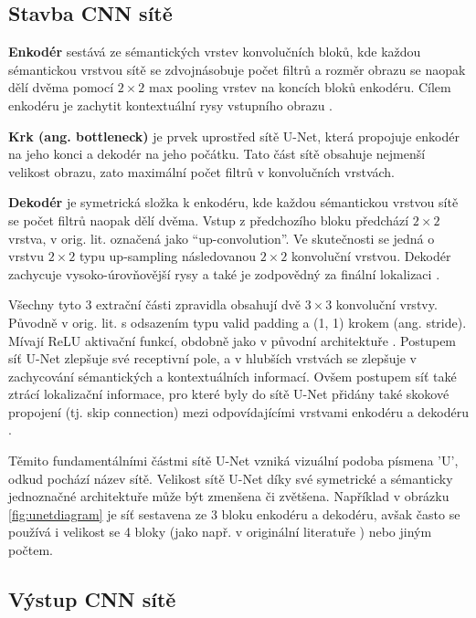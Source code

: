 \subsection{Stavba CNN sítě}
\label{subsec:Chapter221}

\textbf{Enkodér} sestává ze sémantických vrstev konvolučních bloků, kde každou sémantickou vrstvou sítě se zdvojnásobuje počet filtrů a rozměr obrazu se naopak dělí dvěma pomocí $2\times2$ max pooling vrstev na koncích bloků enkodéru. Cílem enkodéru je zachytit kontextuální rysy vstupního obrazu \cite{unet_success}.

\textbf{Krk (ang. bottleneck)} je prvek uprostřed sítě U-Net, která propojuje enkodér na jeho konci a dekodér na jeho počátku. Tato část sítě obsahuje nejmenší velikost obrazu, zato maximální počet filtrů v konvolučních vrstvách.

\textbf{Dekodér} je symetrická složka k enkodéru, kde každou sémantickou vrstvou sítě se počet filtrů naopak dělí dvěma. Vstup z předchozího bloku předchází $2\times2$ vrstva, v orig. lit. označená jako \enquote{up-convolution}. Ve skutečnosti se jedná o vrstvu $2\times2$ typu up-sampling následovanou $2\times2$ konvoluční vrstvou. Dekodér zachycuje vysoko-úrovňovější rysy a také je zodpovědný za finální lokalizaci \cite{unet_success}.

Všechny tyto 3 extrační části zpravidla obsahují dvě $3\times3$ konvoluční vrstvy. Původně v orig. lit. s odsazením typu valid padding a (1, 1) krokem (ang. stride). Mívají ReLU aktivační funkcí, obdobně jako v původní architektuře \cite{unet}. Postupem síť U-Net zlepšuje své receptivní pole, a v hlubších vrstvách se zlepšuje v zachycování sémantických a kontextuálních informací. Ovšem postupem síť také ztrácí lokalizační informace, pro které byly do sítě U-Net přidány také skokové propojení (tj. skip connection) mezi odpovídajícími vrstvami enkodéru a dekodéru \cite{unet_success}.

Těmito fundamentálními částmi sítě U-Net vzniká vizuální podoba písmena 'U', odkud pochází název sítě. Velikost sítě U-Net díky své symetrické a sémanticky jednoznačné architektuře může být zmenšena či zvětšena. Například v obrázku \ref{fig:unetdiagram} je síť sestavena ze 3 bloku enkodéru a dekodéru, avšak často se používá i velikost se 4 bloky (jako např. v originální literatuře \cite{unet}) nebo jiným počtem.

\subsection{Výstup CNN sítě}
\label{subsec:Chapter222}

